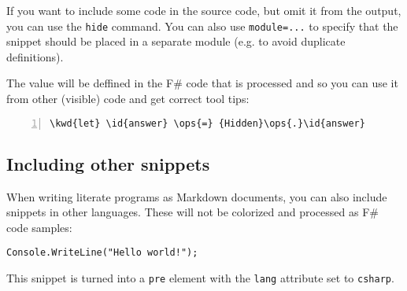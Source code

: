 \documentclass{article}
\newcommand{\id}[1]{\textcolor{black}{#1}}
\newcommand{\kwd}[1]{\textcolor{navy}{#1}}
\newcommand{\ops}[1]{\textcolor{purple}{#1}}
\begin{document}
If you want to include some code in the source code, 
but omit it from the output, you can use the \texttt{hide} 
command. You can also use \texttt{module=...} to specify that 
the snippet should be placed in a separate module 
(e.g. to avoid duplicate definitions).


The value will be deffined in the F\# code that is 
processed and so you can use it from other (visible) 
code and get correct tool tips:
\begin{Verbatim}[commandchars=\\\{\}, numbers=left]
\kwd{let} \id{answer} \ops{=} {Hidden}\ops{.}\id{answer}

\end{Verbatim}

\subsection*{Including other snippets}



When writing literate programs as Markdown documents, 
you can also include snippets in other languages. 
These will not be colorized and processed as F\# 
code samples:
\begin{lstlisting}
Console.WriteLine("Hello world!");

\end{lstlisting}


This snippet is turned into a \texttt{pre} element with the
\texttt{lang} attribute set to \texttt{csharp}.
\end{document}

